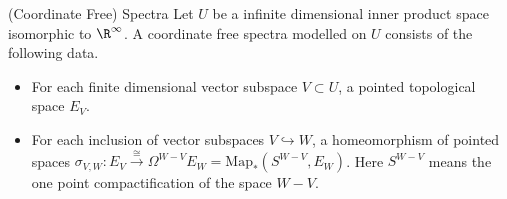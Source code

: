 \documentclass[a4paper]{article}
\begin{document}
\begin{defn}{(Coordinate Free) Spectra}{} Let $U$ be a infinite dimensional inner product space isomorphic to $\R^\infty$. A coordinate free spectra modelled on $U$ consists of the following data. 
\begin{itemize}
\item For each finite dimensional vector subspace $V\subset U$, a pointed topological space $E_V$. 
\item For each inclusion of vector subspaces $V\hookrightarrow W$, a homeomorphism of pointed spaces $\sigma_{V,W}:E_V\overset{\cong}{\rightarrow}\Omega^{W-V}E_W=\text{Map}_\ast(S^{W-V},E_W)$. Here $S^{W-V}$ means the one point compactification of the space $W-V$. 
\end{itemize}
\end{defn}
\end{document}
